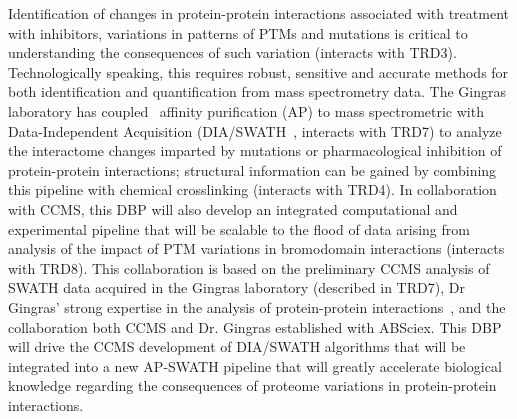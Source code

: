 \documentclass[arial,11pt]{article}
\begin{document}
Identification of changes in protein-protein interactions associated with treatment with inhibitors, variations in patterns of PTMs and  mutations is critical to understanding the consequences of such variation (interacts with TRD3). Technologically speaking, this requires robust, sensitive and accurate methods for both identification and quantification from mass spectrometry data. The Gingras laboratory has coupled~\cite{choi10} affinity purification (AP) to mass spectrometric with Data-Independent Acquisition (DIA/SWATH~\cite{gillet12,tate12}, interacts with TRD7) to analyze the interactome changes imparted by mutations or pharmacological inhibition of protein-protein interactions; structural information can be gained by combining this pipeline with chemical crosslinking (interacts with TRD4). In collaboration with CCMS, this DBP will also develop an integrated computational and experimental pipeline that will be scalable to the flood of data arising from analysis of the impact of PTM variations in bromodomain interactions (interacts with TRD8). This collaboration is based on the preliminary CCMS analysis of SWATH data acquired in the Gingras laboratory (described in TRD7), Dr Gingras'
strong expertise in the analysis of protein-protein interactions~\cite{choi10,breitkreutz10,filippakopoulos12}, and the collaboration both CCMS and Dr. Gingras  established with ABSciex. This DBP will drive the CCMS development of DIA/SWATH algorithms that will be integrated into a new AP-SWATH pipeline that will greatly accelerate biological knowledge regarding the consequences of proteome variations in protein-protein interactions.

\end{document}
